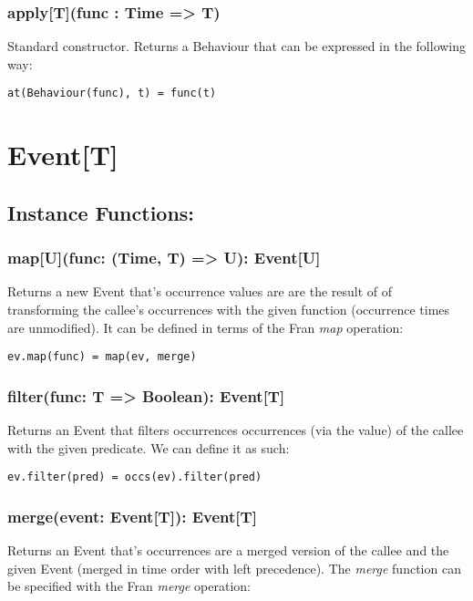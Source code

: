     \subsubsection*{apply[T](func : Time => T)}
      Standard constructor. Returns a Behaviour
      that can be expressed in the following way:

\begin{verbatim}
at(Behaviour(func), t) = func(t)
\end{verbatim}
      
  \section*{Event[T]}
    \subsection*{Instance Functions:}
    \subsubsection*{map[U](func: (Time, T) => U): Event[U]}
      Returns a new Event that's occurrence values
      are are the result of of transforming the
      callee's occurrences with the given function (occurrence
      times are unmodified). It can be defined in terms of 
      the Fran \emph{map} operation:

\begin{verbatim}
ev.map(func) = map(ev, merge)
\end{verbatim}      
    
    \subsubsection*{filter(func: T => Boolean): Event[T]}
      Returns an Event that filters occurrences
      occurrences (via the value) of the callee
      with the given predicate. We can define it as such:

\begin{verbatim}
ev.filter(pred) = occs(ev).filter(pred)
\end{verbatim}
      
    \subsubsection*{merge(event: Event[T]): Event[T]}
      Returns an Event that's occurrences
      are a merged version of the callee
      and the given Event (merged in time order
      with left precedence). The \emph{merge}
      function can be specified with the Fran \emph{merge}
      operation:


